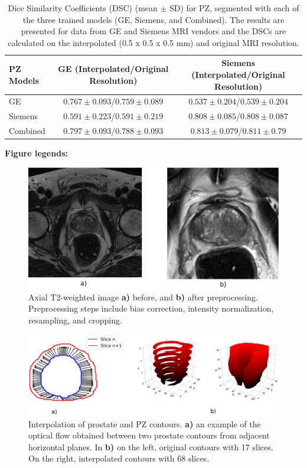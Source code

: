 \newpage
\begin{table}[ht]
     \caption{Dice Similarity Coefficients (DSC) (mean $\pm$ SD) for PZ, segmented with each of the three trained models (GE, Siemens, and Combined). The results are presented for data from GE and Siemens MRI vendors and the DSCs are calculated on the interpolated (0.5 x 0.5 x 0.5 mm) and original MRI resolution.}
    \begin{tabular}{lcc}
         \hline
            \textbf{PZ Models} & \textbf{GE (Interpolated/Original Resolution)} & \textbf{Siemens (Interpolated/Original Resolution)}\\
         \hline
         GE  & $0.767\pm0.093$/$0.759\pm0.089$ & $0.537\pm0.204$/$0.539\pm0.204$ \\
         \hline
         Siemens  & $0.591\pm0.223$/$0.591\pm0.219$ & $0.808\pm0.085$/$0.808\pm0.087$ \\
         \hline
         Combined & $\mathbf{0.797\pm0.093}$/$0.788\pm0.093$ & $\mathbf{0.813\pm0.079}$/$0.811\pm0.79$\\
         \hline
    \end{tabular}
    \label{tab:res_pz}
\end{table}

\newpage
\textbf{Figure legends:}
\begin{figure}[ht]
    \centering
    \includegraphics[totalheight=.25\textheight]{figures/Figure1.eps}
    \caption{Axial T2-weighted image \textbf{a)} before, and \textbf{b)} after preprocessing. Preprocessing steps include bias correction, intensity normalization, resampling, and cropping.} 
    \label{fig_1}
\end{figure}

\begin{figure}[ht]
    \centering
    \includegraphics[totalheight=.21\textheight]{figures/Figure2.eps}
    \caption{Interpolation of prostate and PZ contours. \textbf{a)} an example of the optical flow obtained between two prostate contours from adjacent horizontal planes. In \textbf{b)} on the left, original contours with 17 slices. On the right, interpolated contours with 68 slices.}
    \label{fig:fig_2}
\end{figure}

